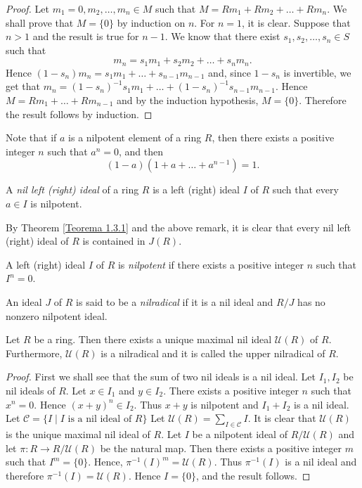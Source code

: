 \begin{proof}
Let $m_1=0,m_2,\dots,m_n\in M$ such that $M=Rm_1+Rm_2+\dots+Rm_n$.
We shall prove that $M=\{0\}$ by induction on $n$. For $n=1$, it is clear. Suppose that $n>1$ and the result is true for $n-1$. 
We know that there exist $s_1,s_2,\dots,s_n\in S$ such that
$$m_n=s_1m_1+s_2m_2+\dots+s_nm_n.$$
Hence $(1-s_n)m_n=s_1m_1+\dots+s_{n-1}m_{n-1}$ and, since $1-s_n$ is invertible, we get that
$m_n=(1-s_n)^{-1}s_1m_1+\dots+(1-s_n)^{-1}s_{n-1}m_{n-1}$. Hence $M=Rm_1+\dots+Rm_{n-1}$ and by the induction hypothesis, $M=\{0\}$.
Therefore the result follows by induction.
\end{proof}

Note that if $a$ is a nilpotent element of a ring $R$, then there exists a positive integer $n$ such that $a^n=0$, and then
$$(1-a)(1+a+\dots+a^{n-1})=1.$$

\begin{definition}
A \emph{nil left (right) ideal} of a ring $R$ is a left (right) ideal $I$ of $R$ such that every $a\in I$ is nilpotent. 
\end{definition}

By Theorem \ref{Teorema 1.3.1} and the above remark,
it is clear that every nil left (right) ideal of $R$ is contained in $J(R)$.

\begin{definition}
A left (right) ideal $I$ of $R$ is \emph{nilpotent} if there exists a positive integer $n$ 
such that $I^n=0$. 
\end{definition}

\begin{definition}
An ideal $J$ of $R$ is said to be a \emph{nilradical} if it is a nil ideal and $R/J$ has no nonzero nilpotent ideal.
\end{definition}

\begin{proposition}\label{Prop1.3.4}
Let $R$ be a ring. Then there exists a unique maximal nil ideal $\mathcal{U}(R)$ of $R$. 
Furthermore, $\mathcal{U}(R)$ is a nilradical and it is called the upper nilradical of $R$.
\end{proposition}

\begin{proof}
First we shall see that the sum of two nil ideals is a nil ideal. Let $I_1,I_2$ be  nil ideals of $R$. 
Let $x\in I_1$ and $y\in I_2$. There exists a positive integer $n$ such that $x^n=0$. Hence $(x+y)^n\in
I_2$. Thus $x+y$ is nilpotent and $I_1+I_2$ is a nil ideal. Let $\mathcal{C}=\{ I\mid I\mbox{ is a nil ideal of }R\}$
Let $\mathcal{U}(R)=\sum_{I\in \mathcal{C}}I$. It is clear that  $\mathcal{U}(R)$ is the unique maximal nil ideal of $R$. 
Let $I$ be a nilpotent ideal of $R/\mathcal{U}(R)$ and let
$\pi\colon R\rightarrow R/\mathcal{U}(R)$ be the natural map. Then
there exists a positive integer $m$ such that $I^m=\{0\}$. Hence, $\pi
^{-1}(I)^m=\mathcal{U}(R)$. Thus $\pi ^{-1}(I)$ is a nil ideal and therefore
$\pi ^{-1}(I)=\mathcal{U}(R)$. Hence $I=\{0\}$, and the result follows.
\end{proof}

